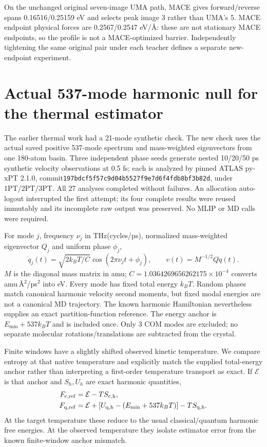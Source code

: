 \documentclass[10pt]{article}
\begin{document}
On the unchanged original seven-image UMA path, MACE gives forward/reverse spans
0.16516/0.25159 eV and selects peak image 3 rather than UMA's 5. MACE endpoint
physical forces are 0.2567/0.2547 eV/\AA: these are not stationary MACE endpoints,
so the profile is not a MACE-optimized barrier. Independently tightening the same
original pair under each teacher defines a separate new-endpoint experiment.
\newpage

\section{Actual 537-mode harmonic null for the thermal estimator}
The earlier thermal work had a 21-mode synthetic check. The new check uses the
actual saved positive 537-mode spectrum and mass-weighted eigenvectors from one
180-atom basin. Three independent phase seeds generate nested 10/20/50 ps
synthetic velocity observations at 0.5 fs; each is analyzed by pinned ATLAS
py-xPT 2.1.0, commit\texttt{197bdcf5f57c9d04b5527f9e7d6f4fdb8bf3b82d}, under 1PT/2PT/3PT.
All 27 analyses completed without failures. An allocation auto-logout interrupted
the first attempt; its four complete results were reused immutably and its
incomplete raw output was preserved. No MLIP or MD calls were required.
\newpage

For mode $j$, frequency $\nu_j$ in THz(cycles/ps), normalized mass-weighted
eigenvector $Q_j$ and uniform phase $\phi_j$,
\begin{equation}
\dot q_j(t)=\sqrt{2 k_BT/C}\cos(2\pi\nu_jt+\phi_j),\qquad
v(t)=M^{-1/2}Q\dot q(t).
\end{equation}
$M$ is the diagonal mass matrix in amu; $C=1.0364269656262175\times 10^{-4}$
converts amu\,\AA$^2$/ps$^2$ into eV. Every mode has fixed total energy $k_BT$.
Random phases match canonical harmonic velocity second moments, but fixed modal
energies are not a canonical MD trajectory. The known harmonic Hamiltonian
nevertheless supplies an exact partition-function reference. The energy anchor
is $E_{\min}+537 k_BT$ and is included once. Only 3 COM modes are excluded;
no separate molecular rotations/translations are subtracted from the crystal.

Finite windows have a slightly shifted observed kinetic temperature. We compare
entropy at that native temperature and explicitly match the supplied total-energy
anchor rather than interpreting a first-order temperature transport as exact.
If $\mathcal E$ is that anchor and $S_h,U_h$ are exact harmonic quantities,
\begin{align}
F_{\rm c,ref}&=\mathcal E-TS_{\rm c,h},\\
F_{\rm q,ref}&=\mathcal E+[U_{\rm q,h}-(E_{\min}+537 k_BT)]-TS_{\rm q,h}.
\end{align}
At the target temperature these reduce to the usual classical/quantum harmonic
free energies. At the observed temperature they isolate estimator error from
the known finite-window anchor mismatch.
\end{document}

